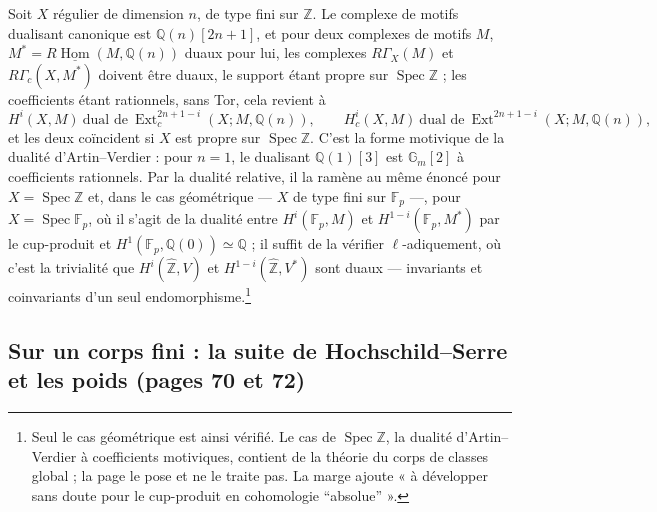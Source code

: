 \documentclass[11pt,a4paper]{article}
\begin{document}
Soit $X$ régulier de dimension $n$, de type fini sur $\mathbb{Z}$. Le complexe
de motifs dualisant canonique est $\mathbb{Q}(n)[2n+1]$, et pour deux complexes
de motifs $M$, $M^{*} = R\underline{\operatorname{Hom}}(M, \mathbb{Q}(n))$ duaux
pour lui, les complexes $R\Gamma_{X}(M)$ et $R\Gamma_{c}(X, M^{*})$ doivent être
duaux, le support étant propre sur $\operatorname{Spec}\mathbb{Z}$ ; les coefficients
étant rationnels, sans Tor, cela revient à
\[
H^{i}(X, M) \ \text{dual de}\ \operatorname{Ext}_{c}^{2n+1-i}(X ; M, \mathbb{Q}(n)) ,
\qquad
H^{i}_{c}(X, M) \ \text{dual de}\ \operatorname{Ext}^{2n+1-i}(X ; M, \mathbb{Q}(n)) ,
\]
et les deux coïncident si $X$ est propre sur $\operatorname{Spec}\mathbb{Z}$.
C'est la forme motivique de la dualité d'Artin--Verdier : pour $n = 1$, le
dualisant $\mathbb{Q}(1)[3]$ est $\mathbb{G}_{m}[2]$ à coefficients rationnels.
Par la dualité relative, il la ramène au même énoncé pour $X =
\operatorname{Spec}\mathbb{Z}$ et, dans le cas géométrique --- $X$ de type fini
sur $\mathbb{F}_{p}$ ---, pour $X = \operatorname{Spec}\mathbb{F}_{p}$, où il s'agit de la dualité
entre $H^{i}(\mathbb{F}_{p}, M)$ et $H^{1-i}(\mathbb{F}_{p}, M^{*})$ par le
cup-produit et $H^{1}(\mathbb{F}_{p}, \mathbb{Q}(0)) \simeq \mathbb{Q}$ ; il suffit
de la vérifier $\ell$-adiquement, où c'est la trivialité que $H^{i}(\hat{\mathbb{Z}},
V)$ et $H^{1-i}(\hat{\mathbb{Z}}, V^{*})$ sont duaux --- invariants et coinvariants
d'un seul endomorphisme.\footnote{Seul le cas géométrique est ainsi vérifié.
Le cas de $\operatorname{Spec}\mathbb{Z}$, la dualité d'Artin--Verdier à
coefficients motiviques, contient de la théorie du corps de classes global ;
la page le pose et ne le traite pas. La marge ajoute « à développer sans doute
pour le cup-produit en cohomologie “absolue” ».}

\subsection*{Sur un corps fini : la suite de Hochschild--Serre et les poids (pages 70 et 72)}
\end{document}

